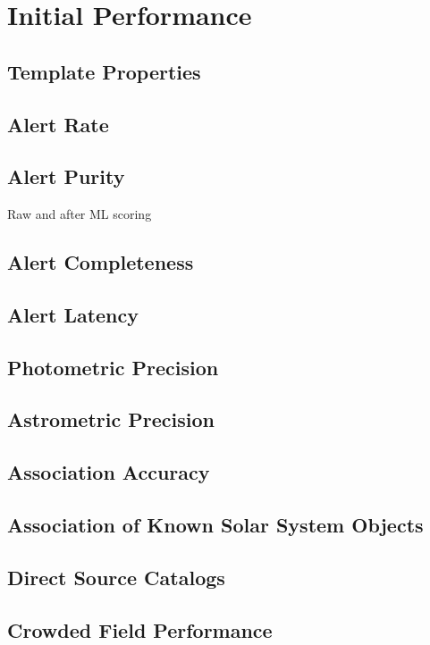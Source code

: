 \section{Initial Performance} \label{sec:performance}

\subsection{Template Properties}

\subsection{Alert Rate} \label{sec:rates}

\subsection{Alert Purity} \label{sec:purity}

Raw and after ML scoring


\subsection{Alert Completeness}

\subsection{Alert Latency}

\subsection{Photometric Precision}

\subsection{Astrometric Precision}

\subsection{Association Accuracy}

\subsection{Association of Known Solar System Objects}


\subsection{Direct Source Catalogs}

\subsection{Crowded Field Performance}